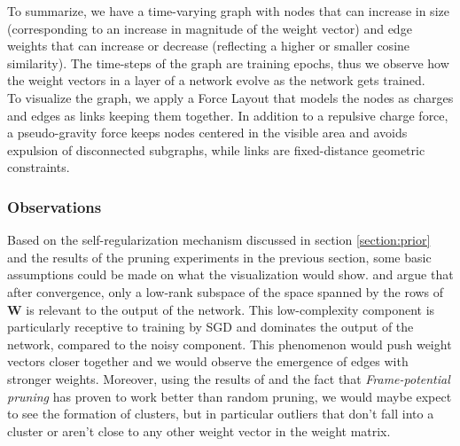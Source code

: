 To summarize, we have a time-varying graph with nodes that can increase in size (corresponding to an increase in magnitude of the weight vector) and edge weights that can increase or decrease (reflecting a higher or smaller cosine similarity). The time-steps of the graph are training epochs, thus we observe how the weight vectors in a layer of a network evolve as the network gets trained. \\

To visualize the graph, we apply a Force Layout that models the nodes as charges and edges as links keeping them together. In addition to a repulsive charge force, a pseudo-gravity force keeps nodes centered in the visible area and avoids expulsion of disconnected subgraphs, while links are fixed-distance geometric constraints.


\subsubsection*{Observations}
Based on the self-regularization mechanism discussed in section \ref{section:prior} and the results of the pruning experiments in the previous section, some basic assumptions could be made on what the visualization would show. \cite{martin2018implicit} and \cite{nagarajan2019uniform} argue that after convergence, only a low-rank subspace of the space spanned by the rows of $\mathbf{W}$ is relevant to the output of the network. This low-complexity component is particularly receptive to training by SGD and dominates the output of the network, compared to the noisy component. This phenomenon would push weight vectors closer together and we would observe the emergence of edges with stronger weights. Moreover, using the results of \cite{brutzkus2019larger} and the fact that \textit{Frame-potential pruning} has proven to work better than random pruning, we would maybe expect to see the formation of clusters, but in particular outliers that don't fall into a cluster or aren't close to any other weight vector in the weight matrix. \\

